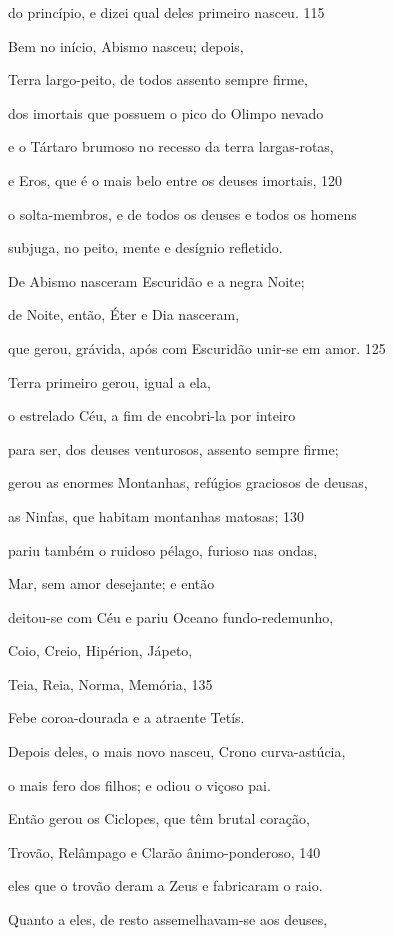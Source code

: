 do princípio, e dizei qual deles primeiro nasceu. \num{115}

\quad{}Bem no início, Abismo nasceu; depois,

Terra largo-peito, de todos assento sempre firme,

dos imortais que possuem o pico do Olimpo nevado

e o Tártaro brumoso no recesso da terra largas-rotas,

e Eros, que é o mais belo entre os deuses imortais, \num{120}

o solta-membros, e de todos os deuses e todos os homens

subjuga, no peito, mente e desígnio refletido.

\medskip

De Abismo nasceram Escuridão e a negra Noite;

de Noite, então, Éter e Dia nasceram,

que gerou, grávida, após com Escuridão unir-se em amor. \num{125}

\medskip

Terra primeiro gerou, igual a ela,

o estrelado Céu, a fim de encobri-la por inteiro

para ser, dos deuses venturosos, assento sempre firme;

gerou as enormes Montanhas, refúgios graciosos de deusas,

as Ninfas, que habitam montanhas matosas; \num{130}

pariu também o ruidoso pélago, furioso nas ondas,

Mar, sem amor desejante; e então

deitou-se com Céu e pariu Oceano fundo-redemunho,

Coio, Creio, Hipérion, Jápeto,

Teia, Reia, Norma, Memória, \num{135}

Febe coroa-dourada e a atraente Tetís.

Depois deles, o mais novo nasceu, Crono curva-astúcia,

o mais fero dos filhos; e odiou o viçoso pai.

\quad{}Então gerou os Ciclopes, que têm brutal coração,

Trovão, Relâmpago e Clarão ânimo-ponderoso, \num{140}

eles que o trovão deram a Zeus e fabricaram o raio.

Quanto a eles, de resto assemelhavam-se aos deuses,

